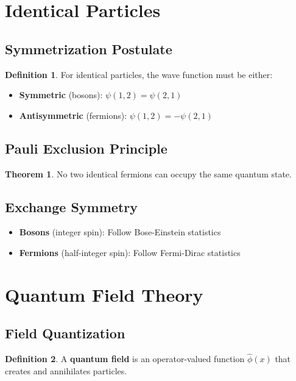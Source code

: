 \documentclass[11pt]{article}
\theoremstyle{definition}
\newtheorem{definition}{Definition}[section]
\newtheorem{theorem}{Theorem}[section]
\begin{document}
\section{Identical Particles}

\subsection{Symmetrization Postulate}
\begin{definition}
For identical particles, the wave function must be either:
\begin{itemize}
    \item \textbf{Symmetric} (bosons): $\psi(1,2) = \psi(2,1)$
    \item \textbf{Antisymmetric} (fermions): $\psi(1,2) = -\psi(2,1)$
\end{itemize}
\end{definition}

\subsection{Pauli Exclusion Principle}
\begin{theorem}
No two identical fermions can occupy the same quantum state.
\end{theorem}

\subsection{Exchange Symmetry}
\begin{itemize}
    \item \textbf{Bosons} (integer spin): Follow Bose-Einstein statistics
    \item \textbf{Fermions} (half-integer spin): Follow Fermi-Dirac statistics
\end{itemize}

\section{Quantum Field Theory}

\subsection{Field Quantization}
\begin{definition}
A \textbf{quantum field} is an operator-valued function $\hat{\phi}(x)$ that creates and annihilates particles.
\end{definition}
\end{document}
